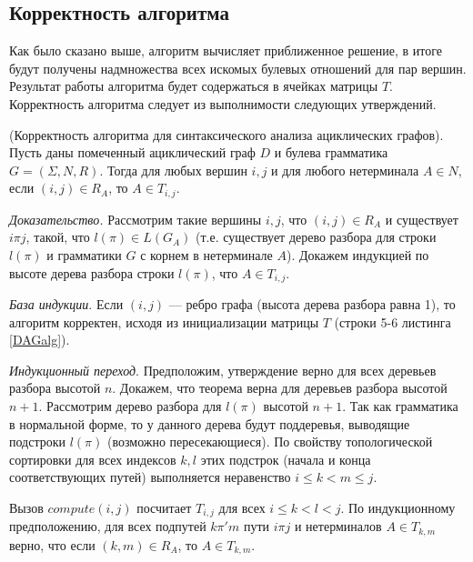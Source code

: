 \documentclass{spbau-diploma}
\begin{document}
\subsection {Корректность алгоритма} 
Как было сказано выше, алгоритм вычисляет приближенное решение, в итоге будут получены надмножества всех искомых булевых отношений для пар вершин. Результат работы алгоритма  будет содержаться в ячейках матрицы $T$.
Корректность алгоритма следует из выполнимости следующих утверждений.
\begin{theoremrus} (Корректность алгоритма для синтаксического
анализа ациклических графов). Пусть даны помеченный
ациклический граф $D$ и булева грамматика $G = (\Sigma, N, R)$.
Тогда для любых вершин $i, j$ и для любого нетерминала $A \in N$, если
$(i, j) \in R_A$, то $A \in T_{i,j}$. 
\end{theoremrus}
\textit{Доказательство.}  Рассмотрим такие вершины $i,j$, что $(i, j) \in R_A$ и существует $i \pi j$, такой, что $l(\pi) \in L(G_A)$ (т.е. существует дерево разбора для строки $l(\pi)$ и грамматики $G$ с корнем в нетерминале $A$). Докажем индукцией по высоте дерева разбора строки $l(\pi)$, что $A \in T_{i,j}$.

\textit{База индукции}. Если $(i, j)$ --- ребро графа (высота дерева разбора равна 1), то алгоритм корректен, исходя из инициализации
матрицы $T$ (строки 5-6 листинга \ref{DAGalg}).

\textit{Индукционный переход}. Предположим, утверждение верно для
всех деревьев разбора высотой $n$. Докажем, что теорема верна для
деревьев разбора высотой $n+1$. Рассмотрим дерево разбора для $l(\pi)$ высотой $n+1$. Так как
грамматика в нормальной форме, то у данного дерева будут
поддеревья, выводящие подстроки $l(\pi)$ (возможно
пересекающиеся). По свойству топологической сортировки для
всех индексов $k,l$ этих подстрок (начала и конца соответствующих
путей) выполняется неравенство $i \le k < m \le j$. 

Вызов $compute(i, j)$ посчитает $T_{i,j}$ для всех $i \le k < l < j$. По индукционному предположению, для всех подпутей
$k \pi' m$ пути $i \pi j$ и нетерминалов $A \in T_{k,m}$ верно, что если $(k, m) \in R_A$, то $A \in T_{k,m}$. 
\end{document}
